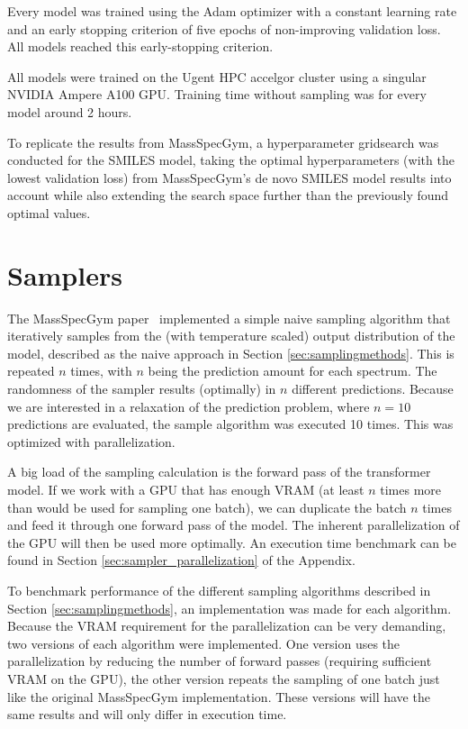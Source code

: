 Every model was trained using the Adam \cite{kingma2014adam} optimizer with a constant learning rate and an early stopping criterion of five epochs of non-improving validation loss.
All models reached this early-stopping criterion.

All models were trained on the Ugent \ac{HPC} accelgor cluster using a singular NVIDIA Ampere A100 GPU.
Training time without sampling was for every model around 2 hours. 

To replicate the results from MassSpecGym, a hyperparameter gridsearch was conducted for the SMILES model, taking the optimal hyperparameters (with the lowest validation loss) from MassSpecGym's de novo SMILES model results into account
while also extending the search space further than the previously found optimal values.

\section{Samplers}
\label{sec:samplers}

The MassSpecGym paper~\cite{bushuiev2024massspecgym} implemented a simple naive sampling algorithm that iteratively samples from the (with temperature scaled) output distribution of the model, described as the naive approach in Section \ref{sec:samplingmethods}.
This is repeated $n$ times, with $n$ being the prediction amount for each spectrum. The randomness of the sampler results (optimally) in $n$ different predictions.
Because we are interested in a relaxation of the prediction problem, where $n=10$ predictions are evaluated, the sample algorithm was executed 10 times. This was optimized with parallelization.

A big load of the sampling calculation is the forward pass of the transformer model. 
If we work with a GPU that has enough VRAM (at least $n$ times more than would be used for sampling one batch),
we can duplicate the batch $n$ times and feed it through one forward pass of the model. The inherent parallelization of the GPU will then be used more optimally.
An execution time benchmark can be found in Section \ref{sec:sampler_parallelization} of the Appendix.

To benchmark performance of the different sampling algorithms described in Section \ref{sec:samplingmethods}, an implementation was made for each algorithm.
Because the VRAM requirement for the parallelization can be very demanding, two versions of each algorithm were implemented. 
One version uses the parallelization by reducing the number of forward passes (requiring sufficient VRAM on the GPU), the other version repeats the sampling of one batch just like the original MassSpecGym implementation.
These versions will have the same results and will only differ in execution time.


